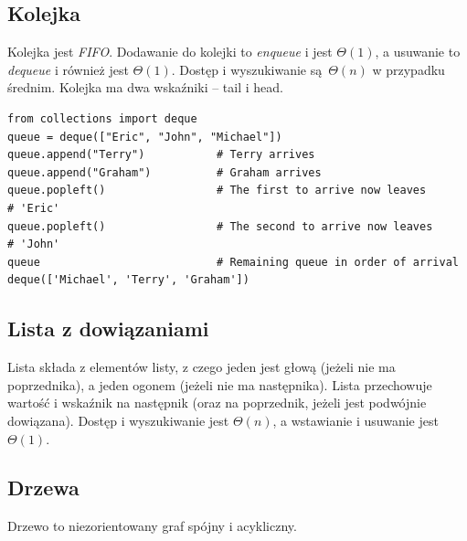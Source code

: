 \documentclass[10pt, oneside]{article}
\theoremstyle{remark}
\begin{document}
\subsection{Kolejka}
Kolejka jest \emph{FIFO}.
Dodawanie do kolejki to \emph{enqueue} i jest $\Theta(1)$, a usuwanie to \emph{dequeue} i również jest $\Theta(1)$.
Dostęp i wyszukiwanie są $\Theta(n)$ w przypadku średnim.
Kolejka ma dwa wskaźniki -- tail i head.
\begin{verbatim}
from collections import deque
queue = deque(["Eric", "John", "Michael"])
queue.append("Terry")           # Terry arrives
queue.append("Graham")          # Graham arrives
queue.popleft()                 # The first to arrive now leaves
# 'Eric'
queue.popleft()                 # The second to arrive now leaves
# 'John'
queue                           # Remaining queue in order of arrival
deque(['Michael', 'Terry', 'Graham'])
\end{verbatim}

\subsection{Lista z dowiązaniami}
Lista składa z elementów listy, z czego jeden jest głową (jeżeli nie ma poprzednika), a jeden ogonem (jeżeli nie ma następnika).
Lista przechowuje wartość i wskaźnik na następnik (oraz na poprzednik, jeżeli jest podwójnie dowiązana).
Dostęp i wyszukiwanie jest $\Theta(n)$, a wstawianie i usuwanie jest $\Theta(1)$.

\subsection{Drzewa}
Drzewo to niezorientowany graf spójny i acykliczny.
\end{document}
